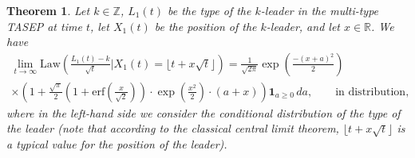 \documentclass[11pt,reqno]{amsart}
\newtheorem{thm}{Theorem}[section]
\theoremstyle{definition}
\theoremstyle{remark}
\theoremstyle{remark}
\def\geq{\geqslant}
\renewcommand\ge{\geq}
\def\Z{\mathbb Z}
\def\R{\mathbb R}
\numberwithin{equation}{section}
\begin{document}
	\begin{thm}
		\label{th:leader-conditioned-asymp}
		Let $k \in \Z$, $L_1 (t)$ be the type of the $k$-leader in the multi-type TASEP at time $t$, let $X_1 (t)$ be the position of the $k$-leader, and let $x \in \R$. We have
		\begin{multline}
			\lim_{t \to \infty} \mathrm{Law} \left( \frac{L_1 (t)-k}{\sqrt{t}} \Biggl| X_1 (t) = \lfloor t + x \sqrt{t} \rfloor \right) = \frac{1}{\sqrt{2 \pi}} \exp \left( \frac{-(x+a)^2}{2} \right) 
			\\ \times \left( 1 + \frac{\sqrt{\pi}}{2} \left( 1 + \mathrm{erf} \left( \frac{x}{\sqrt{2}} \right) \right) \cdot \exp \left( \frac{x^2}{2} \right) \cdot \left( a+x \right) \right) \mathbf{1}_{a \ge 0} \, da, \qquad \mbox{in distribution},
		\end{multline}
		where in the left-hand side we consider the conditional distribution of the type of the leader (note that according to the classical central limit theorem, $\lfloor t + x \sqrt{t} \rfloor$ is a typical value for the position of the leader). 
	\end{thm}
	
\end{document}

